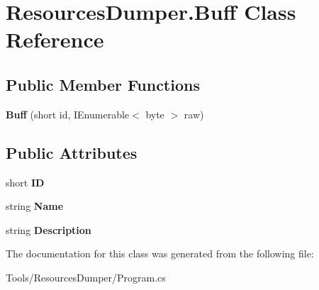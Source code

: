 \hypertarget{class_resources_dumper_1_1_buff}{\section{Resources\-Dumper.\-Buff Class Reference}
\label{class_resources_dumper_1_1_buff}
}
\subsection*{Public Member Functions}
\begin{DoxyCompactItemize}
\item 
\hypertarget{class_resources_dumper_1_1_buff_a388b81f3e08ba847a6e60d569071df04}{{\bfseries Buff} (short id, I\-Enumerable$<$ byte $>$ raw)}\label{class_resources_dumper_1_1_buff_a388b81f3e08ba847a6e60d569071df04}

\end{DoxyCompactItemize}
\subsection*{Public Attributes}
\begin{DoxyCompactItemize}
\item 
\hypertarget{class_resources_dumper_1_1_buff_a8d54f886805c200ff2472a1000b2af80}{short {\bfseries I\-D}}\label{class_resources_dumper_1_1_buff_a8d54f886805c200ff2472a1000b2af80}

\item 
\hypertarget{class_resources_dumper_1_1_buff_a26e5a56f411f66cf649749b2abad3edc}{string {\bfseries Name}}\label{class_resources_dumper_1_1_buff_a26e5a56f411f66cf649749b2abad3edc}

\item 
\hypertarget{class_resources_dumper_1_1_buff_a8304b74b7d648119a1510c49f2c3ee70}{string {\bfseries Description}}\label{class_resources_dumper_1_1_buff_a8304b74b7d648119a1510c49f2c3ee70}

\end{DoxyCompactItemize}


The documentation for this class was generated from the following file\-:\begin{DoxyCompactItemize}
\item 
Tools/\-Resources\-Dumper/Program.\-cs\end{DoxyCompactItemize}
